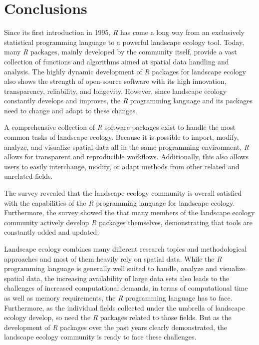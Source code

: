 \documentclass[smallextended]{svjour3}       %
\begin{document}
\hypertarget{conclusions}{%
\section{Conclusions}\label{conclusions}}

Since its first introduction in 1995, \emph{R} has come a long way from an exclusively statistical programming language to a powerful landscape ecology tool.
Today, many \emph{R} packages, mainly developed by the community itself, provide a vast collection of functions and algorithms aimed at spatial data handling and analysis.
The highly dynamic development of \emph{R} packages for landscape ecology also shows the strength of open-source software with its high innovation, transparency, reliability, and longevity.
However, since landscape ecology constantly develops and improves, the \emph{R} programming language and its packages need to change and adapt to these changes.

A comprehensive collection of \emph{R} software packages exist to handle the most common tasks of landscape ecology.
Because it is possible to import, modify, analyze, and visualize spatial data all in the same programming environment, \emph{R} allows for transparent and reproducible workflows.
Additionally, this also allows users to easily interchange, modify, or adapt methods from other related and unrelated fields.

The survey revealed that the landscape ecology community is overall satisfied with the capabilities of the \emph{R} programming language for landscape ecology.
Furthermore, the survey showed the that many members of the landscape ecology community actively develop \emph{R} packages themselves, demonstrating that tools are constantly added and updated.

Landscape ecology combines many different research topics and methodological approaches and most of them heavily rely on spatial data.
While the \emph{R} programming language is generally well suited to handle, analyze and visualize spatial data, the increasing availability of large data sets also leads to the challenges of increased computational demands, in terms of computational time as well as memory requirements, the \emph{R} programming language has to face.
Furthermore, as the individual fields collected under the umbrella of landscape ecology develop, so need the \emph{R} packages related to those fields.
But as the development of \emph{R} packages over the past years clearly demonstrated, the landscape ecology community is ready to face these challenges.
\end{document}
